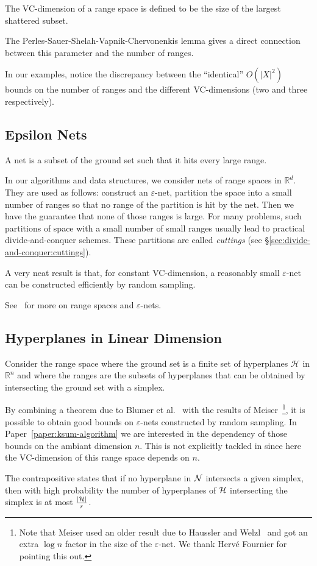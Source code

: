 The VC-dimension of a range space is defined to be the size of the largest
shattered subset.


The Perles-Sauer-Shelah-Vapnik-Chervonenkis lemma gives a direct connection
between this parameter and the number of ranges.
%

%
In our examples, notice the discrepancy between the ``identical''
\(O({|X|}^2)\) bounds on the number of ranges and the different VC-dimensions
(two and three respectively).

\subsection{Epsilon Nets}
\label{sec:divide-and-conquer:epsilon-nets}

A net is a subset of the ground set such that it hits every large range.
%

%
In our algorithms and data structures,
%
we consider nets of range spaces in \(\mathbb{R}^d\).
They are used as follows: construct an \(\varepsilon\)-net,
partition the space into a small number of ranges so that no range of the
partition is hit by the net. Then we have the guarantee that none of those
ranges is large.
%
For many problems,
such partitions of space with a small number of
small ranges usually lead to practical divide-and-conquer schemes.
These partitions are called \emph{cuttings} (see
\S\ref{sec:divide-and-conquer:cuttings}).

A very neat result is that, for constant VC-dimension, a reasonably small
\(\varepsilon\)-net can be constructed efficiently by random sampling.


See~\cite[Section~40.4]{CMR04} for more on range spaces and \(\varepsilon\)-nets.

\subsection{Hyperplanes in Linear Dimension}

Consider the range space where the ground set is a finite set of hyperplanes
\(\mathcal{H}\) in \(\mathbb{R}^n\)
and where the ranges are the subsets of hyperplanes that can be obtained by
intersecting the ground set with a simplex.

By combining a theorem due to Blumer et
al.~\cite{BEHW89} with the results of Meiser~\cite{M93}\footnote{Note that
Meiser used an older result due to Haussler and Welzl~\cite{H87} and got an
extra $\log n$ factor in the size of the $\varepsilon$-net. We thank Hervé
Fournier for pointing this out.}, it is possible to
obtain good bounds on \(\varepsilon\)-nets constructed by
random sampling.
%
In Paper~\ref{paper:ksum-algorithm}
we are interested in the dependency of those bounds on the ambiant dimension
\(n\).
This is not explicitly tackled in 
since here the VC-dimension of this range space depends on \(n\).
%

%
The contrapositive states that if no hyperplane in \(\mathcal{N}\) intersects
a given simplex, then with high probability the number of hyperplanes of
\(\mathcal{H}\) intersecting the simplex is at most \(\frac{| \mathcal{H} |}{r}\).

